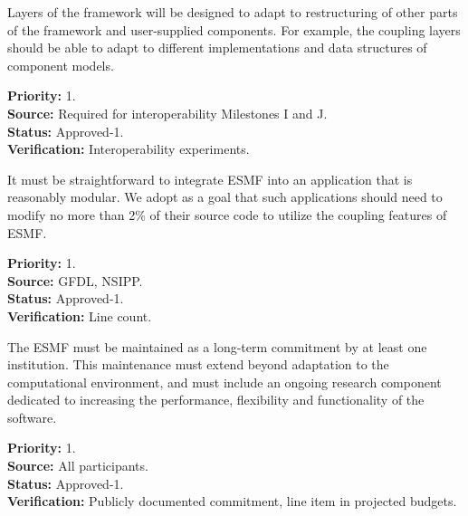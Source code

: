 Layers of the framework will be designed to adapt to restructuring of
other parts of the framework and user-supplied components.  For
example, the coupling layers should be able to adapt to different
implementations and data structures of component models.
\begin{reqlist}
{\bf Priority:} 1. \\
{\bf Source:} Required for interoperability Milestones I and J. \\
{\bf Status:} Approved-1. \\
{\bf Verification:} Interoperability experiments.
\end{reqlist}

It must be straightforward to integrate ESMF into an application 
that is reasonably modular.  We adopt as a goal that such applications should
need to modify no more than 2\% of their source code to utilize the coupling
features of ESMF.
\begin{reqlist}
{\bf Priority:} 1. \\
{\bf Source:} GFDL, NSIPP. \\
{\bf Status:} Approved-1. \\
{\bf Verification:} Line count.
\end{reqlist}

The ESMF must be maintained as a long-term commitment by at least one
institution.  This maintenance must extend beyond adaptation to the 
computational environment, and must include an ongoing research component
dedicated to increasing the performance, flexibility and functionality of
the software.
\begin{reqlist}
{\bf Priority:} 1. \\
{\bf Source:} All participants. \\
{\bf Status:} Approved-1. \\
{\bf Verification:} Publicly documented commitment, line item in 
projected budgets.
\end{reqlist}






